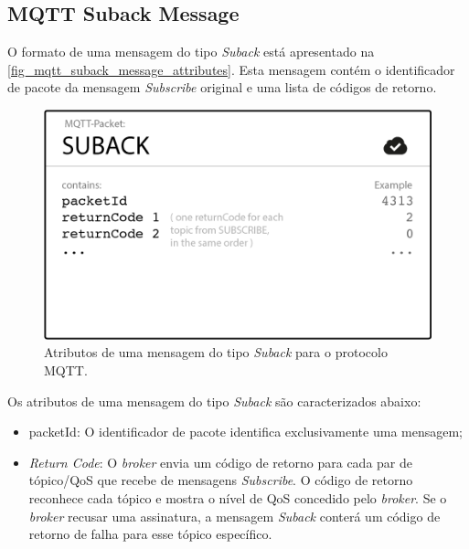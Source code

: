 \subsection{MQTT Suback Message}\label{subsection_mqtt_suback_message}
O formato de uma mensagem do tipo \textit{Suback} está apresentado na \autoref{fig_mqtt_suback_message_attributes}. Esta mensagem contém o identificador de pacote da mensagem \textit{Subscribe} original e uma lista de códigos de retorno.
\begin{figure}[htb]\label{fig_mqtt_suback_message_attributes}
	\begin{center}
		\caption{Atributos de uma mensagem do tipo \textit{Suback} para o protocolo MQTT.}
		\includegraphics[scale=0.5]{Imagens/mqtt_suback_message_attributes.png}
	\end{center}
\end{figure}

Os atributos de uma mensagem do tipo \textit{Suback} são caracterizados abaixo:
\begin{itemize}
	\item packetId: O identificador de pacote identifica exclusivamente uma mensagem;
	\item \textit{Return Code}: O \textit{broker} envia um código de retorno para cada par de tópico/QoS que recebe de mensagens \textit{Subscribe}. O código de retorno reconhece cada tópico e mostra o nível de QoS concedido pelo \textit{broker}. Se o \textit{broker} recusar uma assinatura, a mensagem \textit{Suback} conterá um código de retorno de falha para esse tópico específico.
\end{itemize}


